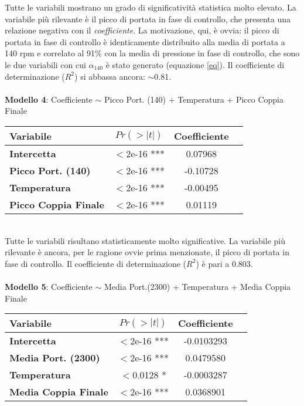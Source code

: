 \documentclass[fleqn,10pt]{SelfArx} %
\begin{document}
Tutte le variabili mostrano un grado di significatività statistica molto elevato. La variabile più rilevante è il picco di portata in fase di controllo, che presenta una relazione negativa con il \textit{coefficiente}. La motivazione, qui, è ovvia: il picco di portata in fase di controllo è identicamente distribuito alla media di portata a 140 rpm e correlato al 91\% con la media di pressione in fase di controllo, che sono le due variabili con cui $\alpha_{140}$ è stato generato (equazione \ref{eq}). Il coefficiente di determinazione ($R^2$) si abbassa ancora: $\sim$0.81.\\
\\
\textbf{Modello 4}: Coefficiente $\sim$  Picco Port. (140) + Temperatura + Picco Coppia Finale
{\begin{table}[h] 
\centering
\begin{tabular}[t]{lccc}
\toprule 
Variabile&$Pr(> |t|)$&Coefficiente\\
\midrule 
\textbf{Intercetta}&$<$2e-16 ***&0.07968\\ 
\textbf{Picco Port. (140)}&$<$2e-16 ***&-0.10728\\
\textbf{Temperatura}&$<$2e-16 ***&-0.00495\\
\textbf{Picco Coppia Finale}&$<$2e-16 ***&0.01119\\
\bottomrule 
\end{tabular}
\end{table}}\\
Tutte le variabili risultano statisticamente molto significative. La variabile più rilevante è ancora, per le ragione ovvie prima menzionate, il picco di portata in fase di controllo. Il coefficiente di determinazione ($R^2$) è pari a 0.803.\\ 
\\
\textbf{Modello 5}: Coefficiente $\sim$ Media Port.(2300) + Temperatura + Media Coppia Finale 
{\begin{table}[H] 
\centering
\begin{tabular}[t]{lccc}
\toprule 
Variabile&$Pr(> |t|)$&Coefficiente\\
\midrule 
\textbf{Intercetta}&$<$2e-16 ***&-0.0103293\\ 
\textbf{Media Port. (2300)}&$<$2e-16 ***&0.0479580\\
\textbf{Temperatura}&$<$0.0128 *&-0.0003287\\
\textbf{Media Coppia Finale}&$<$2e-16 ***&0.0368901\\
\bottomrule 
\end{tabular}
\end{table}}\\
\end{document}
